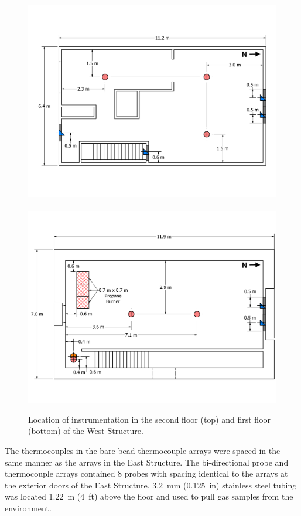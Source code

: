 \documentclass[12pt,oneside]{book}
\begin{document}
\begin{figure}[!ht]
	\includegraphics[width=\columnwidth]{../Figures/Floor_Plans/West_Structure_2nd_Floor_Dimensioned_Instrumentation}
	\\~\\
	\includegraphics[width=\columnwidth]{../Figures/Floor_Plans/West_Structure_1st_Floor_Dimensioned_Instrumentation}
	\caption[Location of instrumentation in the West Structure.]{Location of instrumentation in the second floor (top) and first floor (bottom) of the West Structure.}
	\label{fig:west_instrumentation}
\end{figure}

The thermocouples in the bare-bead thermocouple arrays were spaced in the same manner as the arrays in the East Structure. The bi-directional probe and thermocouple arrays contained 8 probes with spacing identical to the arrays at the exterior doors of the East Structure. 3.2~mm (0.125~in) stainless steel tubing was located 1.22~m (4~ft) above the floor and used to pull gas samples from the environment. 
\end{document}
